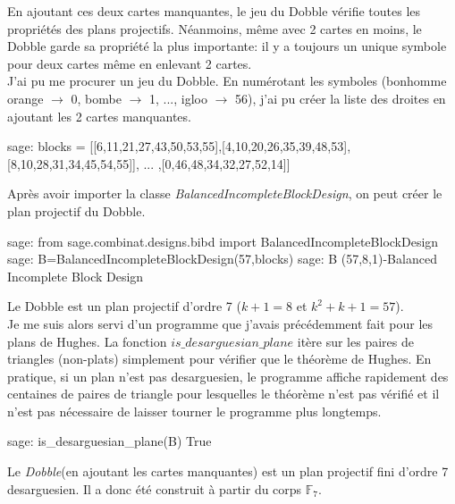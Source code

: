 \documentclass[a4paper]{article}
\begin{document}
En ajoutant ces deux cartes manquantes, le jeu du Dobble vérifie toutes les propriétés des plans projectifs. Néanmoins, même avec 2 cartes en moins, le Dobble garde sa propriété la plus importante: il y a toujours un unique symbole pour deux cartes même en enlevant 2 cartes.\vspace{1\baselineskip}\\
J'ai pu me procurer un jeu du Dobble. En numérotant les symboles (bonhomme orange $\rightarrow$ 0, bombe $\rightarrow$ 1, ..., igloo $\rightarrow$ 56), j'ai pu créer la liste des droites en ajoutant les 2 cartes manquantes.
\begin{sageverbatim}
  sage: blocks = [[6,11,21,27,43,50,53,55],[4,10,20,26,35,39,48,53],
        [8,10,28,31,34,45,54,55]], ... ,[0,46,48,34,32,27,52,14]]
\end{sageverbatim}
Après avoir importer la classe \textit{BalancedIncompleteBlockDesign}, on peut créer le plan projectif du Dobble.
\begin{sageverbatim}
 sage: from sage.combinat.designs.bibd import BalancedIncompleteBlockDesign
 sage: B=BalancedIncompleteBlockDesign(57,blocks)
 sage: B
 (57,8,1)-Balanced Incomplete Block Design
\end{sageverbatim}
Le Dobble est un plan projectif d'ordre 7 ($k+1=8$ et $k^2+k+1=57$).\\
\newpage
Je me suis alors servi d'un programme que j'avais précédemment fait pour les plans de Hughes. La fonction $is\_desarguesian\_plane$ itère sur les paires de triangles (non-plats) simplement pour vérifier que le théorème de Hughes. En pratique, si un plan n'est pas desarguesien, le programme affiche rapidement des centaines de paires de triangle pour lesquelles le théorème n'est pas vérifié et il n'est pas nécessaire de laisser tourner le programme plus longtemps.
\begin{sageverbatim}
 sage: is_desarguesian_plane(B)
 True
\end{sageverbatim}
Le \textit{Dobble}(en ajoutant les cartes manquantes) est un plan projectif fini d'ordre 7 desarguesien. Il a donc été construit à partir du corps $\mathbb{F}_7$.
\vspace{3\baselineskip}
\end{document}
